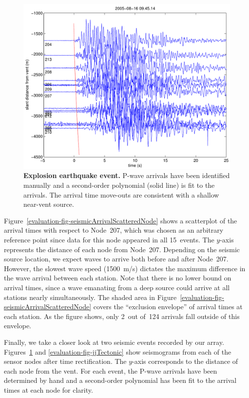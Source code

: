 \begin{figure}[t!]
\begin{center}
\includegraphics[width=0.8\hsize]{./3-evaluation/figs/fidelity/seismicArrival/johnson/2005-08-16_09-45-14.pdf}
\end{center}
\caption{\textbf{Explosion earthquake event.}
P-wave arrivals have been identified manually and a second-order polynomial
(solid line) is fit to the arrivals. The arrival time move-outs are
consistent with a shallow near-vent source.}
\label{evaluation-fig-jjExplosion}
\end{figure}

Figure~\ref{evaluation-fig-seismicArrivalScatteredNode} shows a scatterplot
of the arrival times with respect to Node~207, which was chosen as an
arbitrary reference point since data for this node appeared in all 15~events.
The $y$-axis represents the distance of each node from Node~207. Depending on
the seismic source location, we expect waves to arrive both before and after
Node~207. However, the slowest wave speed (1500~m/s) dictates the maximum
difference in the wave arrival between each station. Note that there is no
lower bound on arrival times, since a wave emanating from a deep source could
arrive at all stations nearly simultaneously. The shaded area in
Figure~\ref{evaluation-fig-seismicArrivalScatteredNode} covers the
``exclusion envelope'' of arrival times at each station. As the figure shows,
only 2~out of~124 arrivals fall outside of this envelope.

Finally, we take a closer look at two seismic events recorded by our array.
Figures~\ref{evaluation-fig-jjExplosion} and \ref{evaluation-fig-jjTectonic}
show seismograms from each of the sensor nodes after time rectification. The
$y$-axis corresponds to the distance of each node from the vent. For each
event, the P-wave arrivals have been determined by hand and a second-order
polynomial has been fit to the arrival times at each node for clarity.

